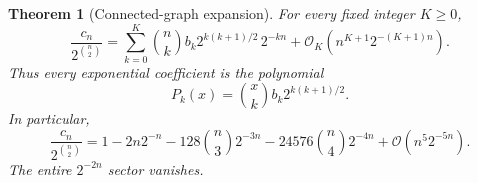 \documentclass[11pt,a4paper]{article}
\numberwithin{equation}{section}
\newtheorem{theorem}{Theorem}[section]
\theoremstyle{definition}
\theoremstyle{remark}
\newcommand{\bigO}{\mathcal O}
\begin{document}
\begin{theorem}[Connected-graph expansion]
\label{thm:graphs}
For every fixed integer $K\ge0$,
\begin{equation}
 \frac{c_n}{2^{\binom n2}}
 =\sum_{k=0}^{K}\binom nk b_k
       2^{k(k+1)/2}\,2^{-kn}
  +\bigO_K\!\left(n^{K+1}2^{-(K+1)n}\right).
 \label{eq:graph-expansion}
\end{equation}
Thus every exponential coefficient is the polynomial
\begin{equation}
 P_k(x)=\binom xk b_k2^{k(k+1)/2}.
 \label{eq:graph-P}
\end{equation}
In particular,
\begin{equation}
 \frac{c_n}{2^{\binom n2}}
 =1-2n2^{-n}-128\binom n3 2^{-3n}
       -24576\binom n4 2^{-4n}
       +\bigO(n^5 2^{-5n}).
 \label{eq:graph-first}
\end{equation}
The entire $2^{-2n}$ sector vanishes.
\end{theorem}
\end{document}
